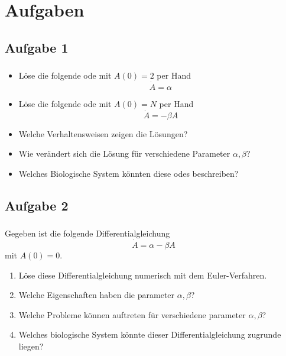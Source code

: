 \section{Aufgaben}
\subsection{Aufgabe 1}
\label{subsec:exercise-1}
\begin{frame}
    \frametitle{\insertsubsection}
    \begin{itemize}[<+->]
        \item Löse die folgende \ac{ode} mit $A(0)=2$ per Hand
        \[\dot{A} = \alpha\]
        \item Löse die folgende \ac{ode} mit $A(0)=N$ per Hand
        \[\dot{A} = - \beta A\]
        \item Welche Verhaltensweisen zeigen die Lösungen?
        \item Wie verändert sich die Lösung für verschiedene Parameter $\alpha, \beta$?
        \item Welches Biologische System könnten diese \acp{ode} beschreiben?
    \end{itemize}
\end{frame}


\subsection{Aufgabe 2}
\label{subsec:exercise-1}
\begin{frame}
    \frametitle{\insertsubsection}
    Gegeben ist die folgende Differentialgleichung
    \[\dot{A} = \alpha - \beta A\]
    mit $A(0)=0$.
    \begin{enumerate}[<+->]
        \item Löse diese Differentialgleichung numerisch mit dem Euler-Verfahren.
        \item Welche Eigenschaften haben die parameter $\alpha,\beta$?
        \item Welche Probleme können auftreten für verschiedene parameter $\alpha,\beta$?
        \item Welches biologische System könnte dieser Differentialgleichung zugrunde liegen?
    \end{enumerate}

\end{frame}


